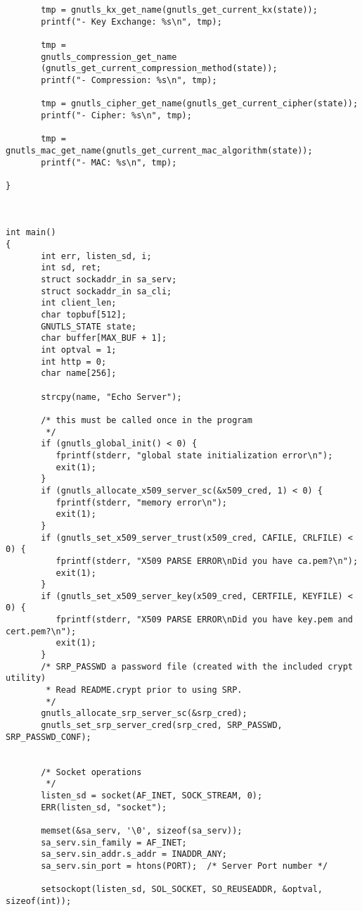 \begin{verbatim}
       tmp = gnutls_kx_get_name(gnutls_get_current_kx(state));
       printf("- Key Exchange: %s\n", tmp);

       tmp =
	   gnutls_compression_get_name
	   (gnutls_get_current_compression_method(state));
       printf("- Compression: %s\n", tmp);

       tmp = gnutls_cipher_get_name(gnutls_get_current_cipher(state));
       printf("- Cipher: %s\n", tmp);

       tmp = gnutls_mac_get_name(gnutls_get_current_mac_algorithm(state));
       printf("- MAC: %s\n", tmp);

}



int main()
{
       int err, listen_sd, i;
       int sd, ret;
       struct sockaddr_in sa_serv;
       struct sockaddr_in sa_cli;
       int client_len;
       char topbuf[512];
       GNUTLS_STATE state;
       char buffer[MAX_BUF + 1];
       int optval = 1;
       int http = 0;
       char name[256];

       strcpy(name, "Echo Server");

       /* this must be called once in the program
        */
       if (gnutls_global_init() < 0) {
	      fprintf(stderr, "global state initialization error\n");
	      exit(1);
       }
       if (gnutls_allocate_x509_server_sc(&x509_cred, 1) < 0) {
	      fprintf(stderr, "memory error\n");
	      exit(1);
       }
       if (gnutls_set_x509_server_trust(x509_cred, CAFILE, CRLFILE) < 0) {
	      fprintf(stderr, "X509 PARSE ERROR\nDid you have ca.pem?\n");
	      exit(1);
       }
       if (gnutls_set_x509_server_key(x509_cred, CERTFILE, KEYFILE) < 0) {
	      fprintf(stderr, "X509 PARSE ERROR\nDid you have key.pem and cert.pem?\n");
	      exit(1);
       }
       /* SRP_PASSWD a password file (created with the included crypt utility) 
        * Read README.crypt prior to using SRP.
        */
       gnutls_allocate_srp_server_sc(&srp_cred);
       gnutls_set_srp_server_cred(srp_cred, SRP_PASSWD, SRP_PASSWD_CONF);


       /* Socket operations
        */
       listen_sd = socket(AF_INET, SOCK_STREAM, 0);
       ERR(listen_sd, "socket");

       memset(&sa_serv, '\0', sizeof(sa_serv));
       sa_serv.sin_family = AF_INET;
       sa_serv.sin_addr.s_addr = INADDR_ANY;
       sa_serv.sin_port = htons(PORT);	/* Server Port number */

       setsockopt(listen_sd, SOL_SOCKET, SO_REUSEADDR, &optval, sizeof(int));
       

\end{verbatim}
